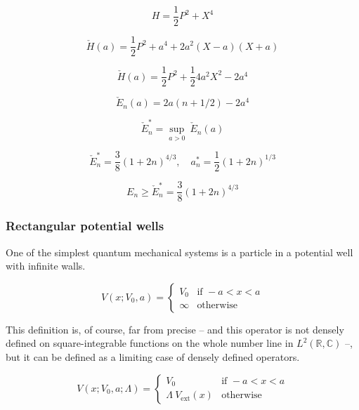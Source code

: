 \documentclass{article}
\theoremstyle{definition}
\begin{document}
\begin{equation}
    H = \frac{1}{2} P^2+X^4
\end{equation}

\begin{equation}
    \check{H}(a) =  \frac{1}{2} P^2+a^4+2 a^2(X-a)(X+a)
\end{equation}

\begin{equation}
    \check{H}(a) =  \frac{1}{2} P^2+\frac{1}{2} 4 a^2 X^2 - 2 a^4
\end{equation}

\begin{equation}
    \check{E}_n(a) = 2 a (n + 1/2) - 2 a^4 
\end{equation}

\begin{equation}
    \check{E}^*_n = \sup_{a>0} \ \check{E}_n(a)
\end{equation}

\begin{equation}
    \check{E}^*_n = \frac{3}{8} (1 + 2 n)^{4/3}, \quad
    a^*_n=\frac{1}{2} (1 + 2 n)^{1/3}
\end{equation}

\begin{equation}
    E_n \ge \check{E}^*_n = \frac{3}{8} (1 + 2 n)^{4/3}
\end{equation}

\subsubsection{Rectangular potential wells}

One of the simplest quantum mechanical systems is a particle in a potential well with infinite walls.

\begin{equation}
    V(x;V_0,a) =
    \begin{cases}
        V_0 & \text{if } -a < x < a \\
        \infty & \text{otherwise}
    \end{cases}
\end{equation}

This definition is, of course, far from precise -- and this operator is not densely defined on square-integrable functions on the whole number line in $L^2(\mathbb{R},\mathbb{C})$ --, but it can be defined as a limiting case of densely defined operators.

\begin{equation}
    V(x;V_0,a;\Lambda) =
    \begin{cases}
        V_0 & \text{if } -a < x < a \\
        \Lambda \  V_{\text{ext}}(x) & \text{otherwise}
    \end{cases}
\end{equation}
\end{document}

